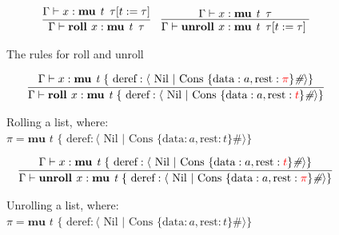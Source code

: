 \begin{figure}
    \centering
    \begin{align*}
        \infer{
            \Gamma \vdash \textbf{roll } x : \textbf{mu } \textit{t}\;\; \tau
        }{
            \Gamma \vdash x : \textbf{mu } \textit{t}\;\; \tau[ t := \tau]
        }
        && \infer{
            \Gamma \vdash \textbf{unroll } x : \textbf{mu } \textit{t}\;\; \tau[ t := \tau]\; 
        }{
            \Gamma \vdash x : \textbf{mu } \textit{t}\;\; \tau
        }
    \end{align*}
    \caption{The rules for roll and unroll}
    \label{def:rollunroll}
\end{figure}

\begin{figure}
    \centering
    \begin{align*}
        \infer{
            \Gamma \vdash \textbf{roll } x : \textbf{mu } \textit{t } \{ \text{ deref}: \langle \text{ Nil } \vert \text{ Cons } \{ \text{data}: a, \text{rest}: {\color{red} t} \}\textit{\#} \rangle \} 
        }{
            \Gamma \vdash x : \textbf{mu } \textit{t } \{ \text{ deref}: \langle \text{ Nil } \vert \text{ Cons } \{ \text{data}: a, \text{rest}: {\color{red} \pi} \}\textit{\#} \rangle \} 
        }
    \end{align*}
    \caption{Rolling a list, where: \newline \protect\phantom{Figure x.x:} $\pi = \textbf{mu } \textit{t } \{ \text{ deref}: \langle \text{ Nil } \vert \text{ Cons } \{ \text{data}: a, \text{rest}: t \}\textit{\#} \rangle \}$}
    \label{fig:rollexample}
\end{figure}

\begin{figure}
    \centering
    \begin{align*}
        \infer{
            \Gamma \vdash \textbf{unroll } x : \textbf{mu } \textit{t } \{ \text{ deref}: \langle \text{ Nil } \vert \text{ Cons } \{ \text{data}: a, \text{rest}: {\color{red} \pi}  \}\textit{\#} \rangle \} 
        }{
            \Gamma \vdash x : \textbf{mu } \textit{t } \{ \text{ deref}: \langle \text{ Nil } \vert \text{ Cons } \{ \text{data}: a, \text{rest}: {\color{red} t} \}\textit{\#} \rangle \} 
        }
    \end{align*}
    \caption{Unrolling a list, where: \newline \protect\phantom{Figure x.x:} $\pi = \textbf{mu } \textit{t } \{ \text{ deref}: \langle \text{ Nil } \vert \text{ Cons } \{ \text{data}: a, \text{rest}: t \}\textit{\#} \rangle \}$}
    \label{fig:unrollexample}
\end{figure}

